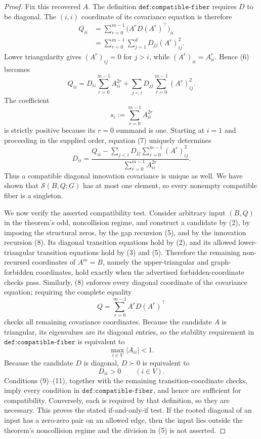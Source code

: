 \documentclass{article}
\begin{document}
\begin{proof}
Fix this recovered \(A\).  The definition \(\texttt{def:compatible-fiber}\) requires \(D\) to be diagonal.  The \((i,i)\) coordinate of its covariance equation is therefore
\[
\begin{aligned}
Q_{ii}
&=\sum_{r=0}^{m-1}\bigl(A^rD(A^r)^\top\bigr)_{ii}\\
&=\sum_{r=0}^{m-1}\sum_{j=1}^{d}D_{jj}(A^r)_{ij}^2.
\end{aligned} \tag{6}
\]
Lower triangularity gives \((A^r)_{ij}=0\) for \(j>i\), while \((A^r)_{ii}=A_{ii}^r\).  Hence (6) becomes
\[
Q_{ii}
=D_{ii}\sum_{r=0}^{m-1}A_{ii}^{2r}
+\sum_{j<i}D_{jj}\sum_{r=0}^{m-1}(A^r)_{ij}^2. \tag{7}
\]
The coefficient
\[
s_i:=\sum_{r=0}^{m-1}A_{ii}^{2r}
\]
is strictly positive because its \(r=0\) summand is one.  Starting at \(i=1\) and proceeding in the supplied order, equation (7) uniquely determines
\[
D_{ii}
=\frac{Q_{ii}-\displaystyle\sum_{j<i}D_{jj}
\displaystyle\sum_{r=0}^{m-1}(A^r)_{ij}^2}
{\displaystyle\sum_{r=0}^{m-1}A_{ii}^{2r}}. \tag{8}
\]
Thus a compatible diagonal innovation covariance is unique as well.  We have shown that \(\mathcal S(B,Q;G)\) has at most one element, so every nonempty compatible fiber is a singleton.

We now verify the asserted compatibility test.  Consider arbitrary input \((B,Q)\) in the theorem's odd, noncollision regime, and construct a candidate by (2), by imposing the structural zeros, by the gap recursion (5), and by the innovation recursion (8).  Its diagonal transition equations hold by (2), and its allowed lower-triangular transition equations hold by (3) and (5).  Therefore the remaining non-recursed coordinates of \(A^m=B\), namely the upper-triangular and graph-forbidden coordinates, hold exactly when the advertised forbidden-coordinate checks pass.  Similarly, (8) enforces every diagonal coordinate of the covariance equation; requiring the complete equality
\[
Q=\sum_{r=0}^{m-1}A^rD(A^r)^\top \tag{9}
\]
checks all remaining covariance coordinates.  Because the candidate \(A\) is triangular, its eigenvalues are its diagonal entries, so the stability requirement in \(\texttt{def:compatible-fiber}\) is equivalent to
\[
\max_{i\in V}|A_{ii}|<1. \tag{10}
\]
Because the candidate \(D\) is diagonal, \(D\succ0\) is equivalent to
\[
D_{ii}>0\qquad(i\in V). \tag{11}
\]
Conditions (9)--(11), together with the remaining transition-coordinate checks, imply every condition in \(\texttt{def:compatible-fiber}\), and hence are sufficient for compatibility.  Conversely, each is required by that definition, so they are necessary.  This proves the stated if-and-only-if test.  If the rooted diagonal of an input has a zero-zero pair on an allowed edge, then the input lies outside the theorem's noncollision regime and the division in (5) is not asserted.


\end{proof}
\end{document}
